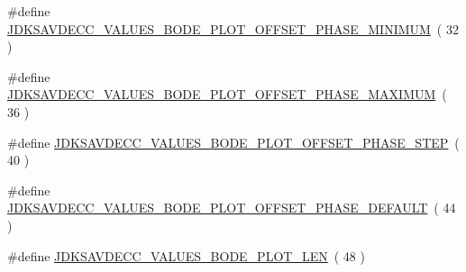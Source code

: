 \begin{DoxyCompactItemize}
\item 
\#define \hyperlink{group__values__bode__plot_ga14fec0f4919e2dfc245fa0ba8779587e}{J\+D\+K\+S\+A\+V\+D\+E\+C\+C\+\_\+\+V\+A\+L\+U\+E\+S\+\_\+\+B\+O\+D\+E\+\_\+\+P\+L\+O\+T\+\_\+\+O\+F\+F\+S\+E\+T\+\_\+\+P\+H\+A\+S\+E\+\_\+\+M\+I\+N\+I\+M\+UM}~( 32 )
\item 
\#define \hyperlink{group__values__bode__plot_ga5dcf4b59c69da4cc9804826a4f63ed8d}{J\+D\+K\+S\+A\+V\+D\+E\+C\+C\+\_\+\+V\+A\+L\+U\+E\+S\+\_\+\+B\+O\+D\+E\+\_\+\+P\+L\+O\+T\+\_\+\+O\+F\+F\+S\+E\+T\+\_\+\+P\+H\+A\+S\+E\+\_\+\+M\+A\+X\+I\+M\+UM}~( 36 )
\item 
\#define \hyperlink{group__values__bode__plot_gafea355654a51b03321dede7a0bdb17c4}{J\+D\+K\+S\+A\+V\+D\+E\+C\+C\+\_\+\+V\+A\+L\+U\+E\+S\+\_\+\+B\+O\+D\+E\+\_\+\+P\+L\+O\+T\+\_\+\+O\+F\+F\+S\+E\+T\+\_\+\+P\+H\+A\+S\+E\+\_\+\+S\+T\+EP}~( 40 )
\item 
\#define \hyperlink{group__values__bode__plot_ga6e27394bb13fc71506cd16c786b288a6}{J\+D\+K\+S\+A\+V\+D\+E\+C\+C\+\_\+\+V\+A\+L\+U\+E\+S\+\_\+\+B\+O\+D\+E\+\_\+\+P\+L\+O\+T\+\_\+\+O\+F\+F\+S\+E\+T\+\_\+\+P\+H\+A\+S\+E\+\_\+\+D\+E\+F\+A\+U\+LT}~( 44 )
\item 
\#define \hyperlink{group__values__bode__plot_gac4af7f3202cb861443874d22de9776b0}{J\+D\+K\+S\+A\+V\+D\+E\+C\+C\+\_\+\+V\+A\+L\+U\+E\+S\+\_\+\+B\+O\+D\+E\+\_\+\+P\+L\+O\+T\+\_\+\+L\+EN}~( 48 )
\end{DoxyCompactItemize}
